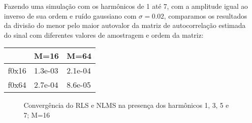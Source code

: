 \documentclass[a4paper, 12pt]{book}
\begin{document}
Fazendo uma simulação com os harmônicos de 1 até 7, com a amplitude igual ao inverso de sua ordem e ruído gaussiano com $\sigma=0.02$, comparamos os resultados da divisão do menor pelo maior autovalor da matriz de autocorrelação estimada do sinal com diferentes valores de amostragem e ordem da matriz:

\begin{table}[H]
	\centering
	\begin{tabular}{l|l|l}
		   & M=16 & M=64 \\
		\hline 
		f0x16      & 1.3e-03 & 2.1e-04 \\
		f0x64      & 2.7e-04  & 8.6e-05       
	\end{tabular}
\end{table}

\begin{figure}[h]
	\centering    
	\def\svgwidth{\columnwidth}
	
	\caption{Convergência do RLS e NLMS na presença dos harmônicos 1, 3, 5 e 7; M=16}
	\label{fig:your image label}
\end{figure}
\end{document}
